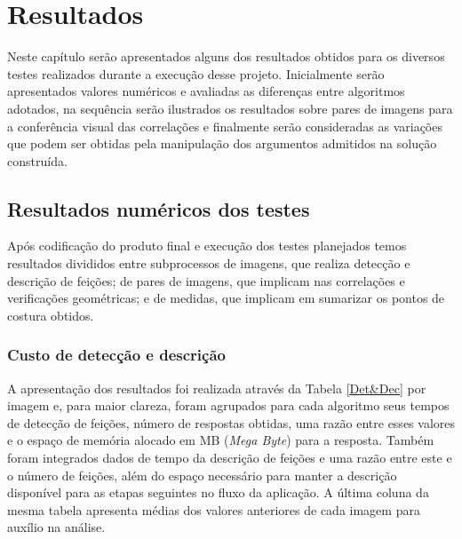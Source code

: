 \chapter{Resultados}\label{results}

Neste capítulo serão apresentados alguns dos resultados obtidos para os diversos testes realizados durante a execução desse projeto. Inicialmente serão apresentados valores numéricos e avaliadas as diferenças entre algoritmos adotados, na sequência serão ilustrados os resultados sobre pares de imagens para a conferência visual das correlações e finalmente serão consideradas as variações que podem ser obtidas pela manipulação dos argumentos admitidos na solução construída. 

\section{Resultados numéricos dos testes}

Após codificação do produto final e execução dos testes planejados temos resultados divididos entre subprocessos de imagens, que realiza detecção e descrição de feições; de pares de imagens, que implicam nas correlações e verificações geométricas; e de medidas, que implicam em sumarizar os pontos de costura obtidos.

\subsection{Custo de detecção e descrição}

A apresentação dos resultados foi realizada através da Tabela \ref{Det&Dec} por imagem e, para maior clareza, foram agrupados para cada algoritmo seus tempos de detecção de feições, número de respostas obtidas, uma razão entre esses valores e o espaço de memória alocado em MB (\textit{Mega Byte}) para a resposta. Também foram integrados dados de tempo da descrição de feições e uma razão entre este e o número de feições, além do espaço necessário para manter a descrição disponível para as etapas seguintes no fluxo da aplicação. A última coluna da mesma tabela apresenta médias dos valores anteriores de cada imagem para auxílio na análise.

